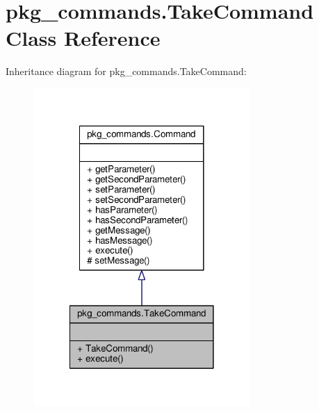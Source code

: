 \hypertarget{classpkg__commands_1_1TakeCommand}{\section{pkg\-\_\-commands.\-Take\-Command Class Reference}
\label{classpkg__commands_1_1TakeCommand}
}


Inheritance diagram for pkg\-\_\-commands.\-Take\-Command\-:
\nopagebreak
\begin{figure}[H]
\begin{center}
\leavevmode
\includegraphics[width=234pt]{classpkg__commands_1_1TakeCommand__inherit__graph}
\end{center}
\end{figure}



